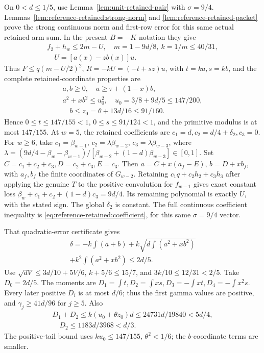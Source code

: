 On \(0<d\le1/5\), use Lemma~\ref{lem:unit-retained-pair} with $\sigma=9/4$. Lemmas~\ref{lem:reference-retained:strong-norm} and \ref{lem:reference-retained-packet} prove the strong continuous norm and first-row error for this same actual retained arm sum. In the present \(B=-K\) notation they give
\[
\begin{gathered}
f_2+h_w\le2m-U,\quad m=1-9d/8,\ k=1/m\le40/31,\\
\quad U=[a(x)-zb(x)]u.
\end{gathered}\tag{C169.7.1}
\]
Thus \(F\le q(m-U/2)^2\), \(R=-kU=(-t+sz)u\), with \(t=ka,\allowbreak \allowbreak  s=kb\), and the complete retained-coordinate properties are
\[
\begin{gathered}
a,b\ge0,\quad a\ge\tau+(1-x)b,\quad\\
a^2+xb^2\le u_0^2,\quad u_0=3/8+9d/5\le147/200,\\
\quad b\le z_0=\theta+13d/16\le91/160.
\end{gathered}\tag{C169.7.2}
\]
Hence \(0\le t\le147/155<1\), \(0\le s\le91/124<1\), and the primitive modulus is at most \(147/155\). At \(w=5\), the retained coefficients are \(c_1=d,\allowbreak \allowbreak  c_2=d/4+\delta_2,\allowbreak \allowbreak  c_3=0\). For \(w\ge6\), take \(c_1=\beta_{w-1}\), \(c_2=\lambda\beta_{w-2}\), \(c_3=\lambda\beta_{w-3}\), where \(\lambda=(9d/4-\beta_w-\beta_{w-1})/[\beta_{w-2}+(1-d)\beta_{w-3}]\in[0,\allowbreak \allowbreak  1]\). Set \(C=c_1+c_2+c_3,\allowbreak \allowbreak  D=c_2+c_3,\allowbreak \allowbreak  E=c_3\). Then \(a=C+x(a_f-E)\), \(b=D+xb_f\), with \(a_f,\allowbreak \allowbreak  b_f\) the finite coordinates of \(G_{w-2}\). Retaining \(c_1q+c_2h_2+c_3h_3\) after applying the genuine \(T\) to the positive convolution for \(f_{w-1}\) gives exact constant loss \(\beta_w+c_1+c_2+(1-d)c_3=9d/4\). Its remaining polynomial is exactly \(U\), with the stated sign. The global \(\delta_2\) is constant. The full continuous coefficient inequality is \eqref{eq:reference-retained:coefficient}, for this same $\sigma=9/4$ vector.

That quadratic-error certificate gives
\[
\begin{gathered}
\delta=-k\int(a+b)+k\sqrt{d\int(a^2+xb^2)}\\
+k^2\int(a^2+xb^2)\le2d/5.
\end{gathered}\tag{C169.7.3}
\]
Use \(\sqrt{dV}\le3d/10+5V/6\), \(k+5/6\le15/7\), and \(3k/10\le12/31<2/5\). Take \(D_0=2d/5\). The moments are \(D_1=\int t,\allowbreak \allowbreak  D_2=\int xs,\allowbreak \allowbreak  D_3=-\int xt,\allowbreak \allowbreak  D_4=-\int x^2s\). Every later positive \(D_i\) is at most \(d/6\); thus the first gamma values are positive, and \(\gamma_j\ge41d/96\) for \(j\ge5\). Also
\[
\begin{gathered}
D_1+D_2\le k(u_0+\theta z_0)d\le24731d/19840<5d/4,\\
\quad D_2\le1183d/3968<d/3.
\end{gathered}\tag{C169.7.4}
\]
The positive-tail bound uses \(ku_0\le147/155\), \(\theta^2<1/6\); the \(b\)-coordinate terms are smaller.

